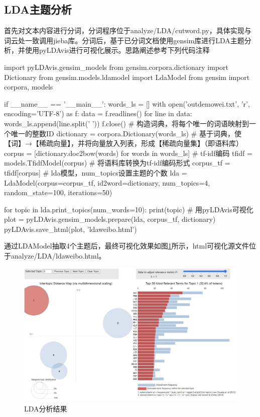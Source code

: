 \subsection{LDA主题分析}
\par{首先对文本内容进行分词，分词程序位于analyze/LDA/cutword.py，具体实现与词云处一致调用jieba库。分词后，基于已分词文档使用gensim库进行LDA主题分析，并使用pyLDAvis进行可视化展示。思路阐述参考下列代码注释}\
\begin{python}
import pyLDAvis.gensim_models
from gensim.corpora.dictionary import Dictionary
from gensim.models.ldamodel import LdaModel
from gensim import corpora, models

if __name__ == '__main__':
    words_ls = []
    with open('outdemowei.txt', 'r', encoding='UTF-8') as f:
        data = f.readlines()
        for line in data:
            words_ls.append(line.split(' '))
    f.close()
    # 构造词典，将每个唯一的词语映射到一个唯一的整数ID
    dictionary = corpora.Dictionary(words_ls)
    # 基于词典，使【词】→【稀疏向量】，并将向量放入列表，形成【稀疏向量集】（即语料库）
    corpus = [dictionary.doc2bow(words) for words in words_ls]
    # tf-idf编码
    tfidf = models.TfidfModel(corpus)
    # 将语料库转换为tf-idf编码形式
    corpus_tf = tfidf[corpus]
    # lda模型，num_topics设置主题的个数
    lda = LdaModel(corpus=corpus_tf, id2word=dictionary, num_topics=4, random_state=100, iterations=50)

    for topic in lda.print_topics(num_words=10):
        print(topic)
    # 用pyLDAvis可视化
    plot = pyLDAvis.gensim_models.prepare(lda, corpus_tf, dictionary)
    pyLDAvis.save_html(plot, 'ldaweibo.html')

\end{python}
通过LDAModel抽取4个主题后，最终可视化效果如图\ref{fig:lda}所示，html可视化源文件位于analyze/LDA/ldaweibo.html。
\begin{figure}[H]
    \centering
    \includegraphics[width=12cm]{figure/lda.jpg}
    \caption{LDA分析结果} \label{fig:lda}
\end{figure} 
